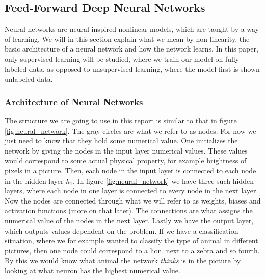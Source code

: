 \documentclass[12pt]{extarticle}
\begin{document}
\subsection{Feed-Forward Deep Neural Networks}\label{sec:NeuralNetwork}
Neural networks are neural-inspired nonlinear models, which are taught by a way of learning. We will in this section explain what we mean by non-linearity, the basic architecture of a neural network and how the network learns. In this paper, only supervised learning will be studied, where we train our model on fully labeled data, as opposed to unsupervised learning, where the model first is shown unlabeled data.

\subsubsection{Architecture of Neural Networks}
The structure we are going to use in this report is similar to that in figure \ref{fig:neural_network}. The gray circles are what we refer to as nodes. For now we just need to know that they hold some numerical value. One initializes the network by giving the nodes in the input layer numerical values. These values would correspond to some actual physical property, for example brightness of pixels in a picture. Then, each node in the input layer is connected to each node in the hidden layer $h_1$. In figure \ref{fig:neural_network} we have three such hidden layers, where each node in one layer is connected to every node in the next layer. Now the nodes are connected through what we will refer to as weights, biases and activation functions (more on that later). The connections are what assigns the numerical value of the nodes in the next layer. Lastly we have the output layer, which outputs values dependent on the problem. If we have a classification situation, where we for example wanted to classify the type of animal in different pictures, then one node could correspond to  a lion, next to a zebra and so fourth. By this we would know what animal the network \textit{thinks} is in the picture by looking at what neuron has the highest numerical value.
\end{document}
